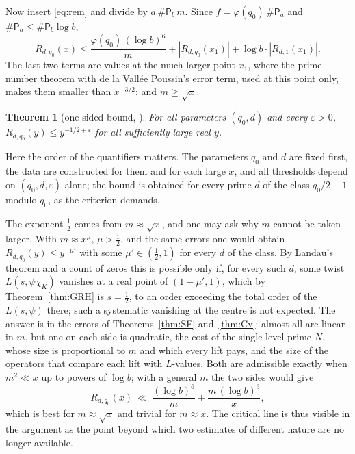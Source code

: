 \documentclass[10pt]{amsart}
\newtheorem{theorem}{Theorem}[section]
\theoremstyle{definition}
\theoremstyle{remark}
\newcommand{\Pa}{\mathsf P_a}
\newcommand{\Pb}{\mathsf P_b}
\begin{document}
Now insert \eqref{eq:rem} and divide by $a\,\#\Pb\,m$. Since $f=\varphi(q_0)\,\#\Pa$ and
$\#\Pa\le\#\Pb\log b$,
\[
 R_{d,q_0}(x)\le\frac{\varphi(q_0)\,(\log b)^6}{m}+|R_{d,q_0}(x_1)|+\log b\cdot|R_{d,1}(x_1)| .
\]
The last two terms are values at the much larger point $x_1$, where the prime number theorem
with de la Vall\'ee Poussin's error term, used at this point only, makes them smaller than
$x^{-3/2}$; and $m\ge\sqrt x$.

\begin{theorem}[one-sided bound, {\cite{P46}}]\label{thm:onesided}
For all parameters $(q_0,d)$ and every $\varepsilon>0$, $R_{d,q_0}(y)\le y^{-1/2+\varepsilon}$ for
all sufficiently large real $y$.
\end{theorem}
Here the order of the quantifiers matters. The parameters $q_0$ and $d$ are fixed first, the
data are constructed for them and for each large $x$, and all thresholds depend on
$(q_0,d,\varepsilon)$ alone; the bound is obtained for every prime $d$ of the class
$q_0/2-1$ modulo $q_0$, as the criterion demands.

The exponent $\tfrac12$ comes from $m\approx\sqrt x$, and one may ask why $m$ cannot be taken
larger. With $m\approx x^{\mu}$, $\mu>\tfrac12$, and the same errors one would obtain
$R_{d,q_0}(y)\le y^{-\mu'}$ with some $\mu'\in(\tfrac12,1)$ for every $d$ of the class. By
Landau's theorem and a count of zeros this is possible only if, for every such $d$, some twist
$L(s,\psi\chi_K)$ vanishes at a real point of $(1-\mu',1)$, which by Theorem~\ref{thm:GRH} is
$s=\tfrac12$, to an order exceeding the total order of the $L(s,\psi)$ there; such a systematic
vanishing at the centre is not expected.
The answer is in the errors of Theorems~\ref{thm:SF} and~\ref{thm:Cv}: almost all are linear in
$m$, but one on each side is quadratic, the cost of the single level prime $N$, whose size is
proportional to $m$ and which every lift pays, and the size of the operators that compare each
lift with $L$-values. Both are admissible exactly when $m^2\ll x$ up to powers of $\log b$; with
a general $m$ the two sides would give
\[
 R_{d,q_0}(x)\ \ll\ \frac{(\log b)^6}{m}+\frac{m\,(\log b)^3}{x},
\]
which is best for $m\approx\sqrt x$ and trivial for $m\approx x$. The
critical line is thus visible in the argument as the point beyond which two estimates of
different nature are no longer available.
\end{document}
